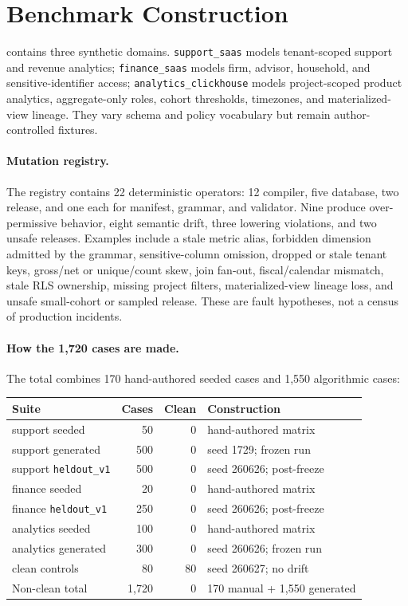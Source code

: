 \section{Benchmark Construction}

\bench{} contains three synthetic domains. \texttt{support\_saas} models tenant-scoped support and revenue analytics; \texttt{finance\_saas} models firm, advisor, household, and sensitive-identifier access; \texttt{analytics\_clickhouse} models project-scoped product analytics, aggregate-only roles, cohort thresholds, timezones, and materialized-view lineage. They vary schema and policy vocabulary but remain author-controlled fixtures.

\paragraph{Mutation registry.}
The registry contains 22 deterministic operators: 12 compiler, five database, two release, and one each for manifest, grammar, and validator. Nine produce over-permissive behavior, eight semantic drift, three lowering violations, and two unsafe releases. Examples include a stale metric alias, forbidden dimension admitted by the grammar, sensitive-column omission, dropped or stale tenant keys, gross/net or unique/count skew, join fan-out, fiscal/calendar mismatch, stale RLS ownership, missing project filters, materialized-view lineage loss, and unsafe small-cohort or sampled release. These are fault hypotheses, not a census of production incidents.

\paragraph{How the 1,720 cases are made.}
The total combines 170 hand-authored seeded cases and 1,550 algorithmic cases:

\begin{center}
\scriptsize
\setlength{\tabcolsep}{2pt}
\begin{tabular}{@{}L{0.37\columnwidth}rrL{0.27\columnwidth}@{}}
\toprule
Suite & Cases & Clean & Construction \\
\midrule
support seeded & 50 & 0 & hand-authored matrix \\
support generated & 500 & 0 & seed 1729; frozen run \\
support \texttt{heldout\_v1} & 500 & 0 & seed 260626; post-freeze \\
finance seeded & 20 & 0 & hand-authored matrix \\
finance \texttt{heldout\_v1} & 250 & 0 & seed 260626; post-freeze \\
analytics seeded & 100 & 0 & hand-authored matrix \\
analytics generated & 300 & 0 & seed 260626; frozen run \\
clean controls & 80 & 80 & seed 260627; no drift \\
\midrule
Non-clean total & 1,720 & 0 & 170 manual + 1,550 generated \\
\bottomrule
\end{tabular}
\end{center}

